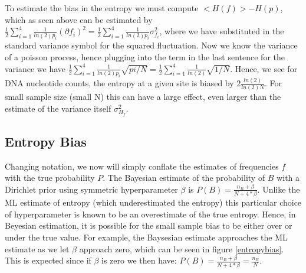 To estimate the bias in the entropy we must compute $< H(f) > - H(p) $, which as seen above can be estimated by $\frac{1}{2}\sum_{i=1}^4 \frac{1}{ln(2)p_i}(\partial{f_i})^2  = \frac{1}{2}\sum_{i=1}^4 \frac{1}{ln(2)p_i}\sigma_{f_i}^2$, where we have substituted in the standard variance symbol for the squared fluctuation.  Now we know the variance of a poisson process, hence plugging into the term in the last sentence for the variance we have $\frac{1}{2}\sum_{i=1}^4 \frac{1}{ln(2)p_i}\sqrt{pi/N} =\frac{1}{2}\sum_{i=1}^4 \frac{1}{ln(2)}\sqrt{1/N}$.  Hence, we see for DNA nucleotide counts, the entropy at a given site is biased by $2\frac{ln(2)}{ln(2)N}$.  For small sample size (small N) this can have a large effect, even larger than the estimate of the variance itself $\sigma_{H_{f}}^2$.  
\subsection{Entropy Bias}\label{entro}
Changing notation, we now will simply conflate the estimates of frequencies $f$ with the true probability $P$.  The Bayesian estimate of the probability of $B$ with a Dirichlet prior using symmetric hyperparameter $\beta$  is $P(B)=\frac{n_{B}+\beta}{N+4*\beta}$\cite{MEP}.  Unlike the ML estimate of entropy (which underestimated the entropy) this particular choice of hyperparameter is known to be an overestimate of the true entropy.  Hence, in Beyesian estimation, it is possible for the small sample bias to be either over or under the true value.  For example, the Baysesian estimate approaches the ML estimate as we let $\beta$ approach zero, which can be seen in figure \ref{entropybias}.  This is expected since if $\beta$ is zero we then have:  $P(B)=\frac{n_{B}+\beta}{N+4*\beta}=\frac{n_{B}}{N}$.

